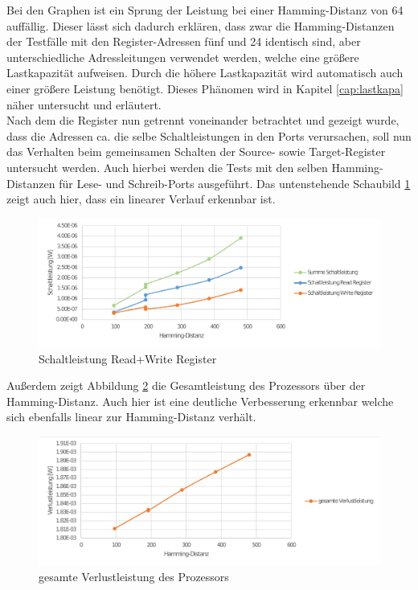 Bei den Graphen ist ein Sprung der Leistung bei einer Hamming-Distanz von 64 auffällig. Dieser lässt sich dadurch erklären, dass zwar die Hamming-Distanzen der Testfälle mit den Register-Adressen fünf und 24 identisch sind, aber unterschiedliche Adressleitungen verwendet werden, welche eine größere Lastkapazität aufweisen. Durch die höhere Lastkapazität wird automatisch auch einer größere Leistung benötigt. Dieses Phänomen wird in Kapitel \ref{cap:lastkapa} näher untersucht und erläutert.\\

Nach dem die Register nun getrennt voneinander betrachtet und gezeigt wurde, dass die Adressen ca. die selbe Schaltleistungen in den Ports verursachen, soll nun das Verhalten beim gemeinsamen Schalten der Source- sowie Target-Register untersucht werden. Auch hierbei werden die Tests mit den selben Hamming-Distanzen für Lese- und Schreib-Ports ausgeführt. Das untenstehende Schaubild \ref{fig:source_target_power} zeigt auch hier, dass ein linearer Verlauf erkennbar ist.

\begin{figure}[H]
	\centering
	\includegraphics[width=\textwidth]{fig/source_target_power.pdf}
	\caption{Schaltleistung Read+Write Register}
	\label{fig:source_target_power}
\end{figure}

Außerdem zeigt Abbildung \ref{fig:total_power_source_target} die Gesamtleistung des Prozessors über der Hamming-Distanz. Auch hier ist eine deutliche Verbesserung erkennbar welche sich ebenfalls linear zur Hamming-Distanz verhält.

\begin{figure}[H]
	\centering
	\includegraphics[width=\textwidth]{fig/total_power_source_target.pdf}
	\caption{gesamte Verlustleistung des Prozessors}
	\label{fig:total_power_source_target}
\end{figure}

